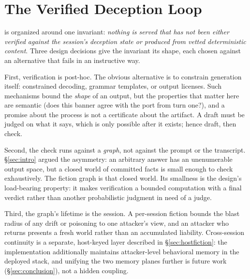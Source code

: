\section{The Verified Deception Loop}
\label{sec:design}

\RAGIN is organized around one invariant: \emph{nothing is served that has
not been either verified against the session's deception state or produced
from vetted deterministic content}. Three design decisions give the
invariant its shape, each chosen against an alternative that fails in an
instructive way.

First, verification is post-hoc. The obvious alternative is to constrain
generation itself: constrained decoding, grammar templates, or output
licenses. Such mechanisms bound the \emph{shape} of an output, but the
properties that matter here are semantic (does this banner agree with the
port from turn one?), and a promise about the process is not a
certificate about the artifact. A draft must be judged on what it says,
which is only possible after it exists; hence draft, then check.

Second, the check runs against a \emph{graph}, not against the prompt or
the transcript. \S\ref{sec:intro} argued the asymmetry: an arbitrary
answer has an unenumerable output space, but a closed world of committed
facts is small enough to check exhaustively. The fiction graph is that
closed world. Its smallness is the design's load-bearing property: it
makes verification a bounded computation with a final verdict rather
than another probabilistic judgment in need of a judge.

Third, the graph's lifetime is the session. A per-session fiction bounds
the blast radius of any drift or poisoning to one attacker's view, and an
attacker who returns presents a fresh world rather than an accumulated
liability. Cross-session continuity is a separate, host-keyed layer
described in \S\ref{sec:hostfiction}: the implementation additionally
maintains attacker-level behavioral memory in the deployed stack, and
unifying the two memory planes further
is future work (\S\ref{sec:conclusion}), not a hidden coupling.

